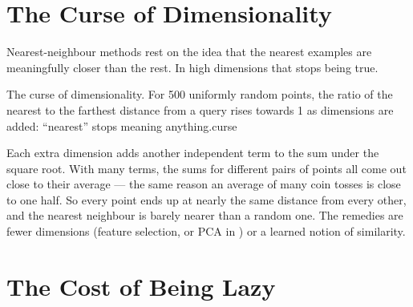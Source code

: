 \section{The Curse of Dimensionality}

Nearest-neighbour methods rest on the idea that the nearest examples are
meaningfully closer than the rest. In high dimensions that stops being true.

%
{The curse of dimensionality. For 500 uniformly random points, the ratio of the
nearest to the farthest distance from a query rises towards 1 as dimensions are
added: ``nearest'' stops meaning anything.}{curse}

\begin{conceptbox}
Each extra dimension adds another independent term to the sum under the square
root. With many terms, the sums for different pairs of points all come out close
to their average --- the same reason an average of many coin tosses is close to
one half. So every point ends up at nearly the same distance from every other, and
the nearest neighbour is barely nearer than a random one. The remedies are fewer
dimensions (feature selection, or PCA in ) or a learned notion of
similarity.
\end{conceptbox}

\section{The Cost of Being Lazy}

